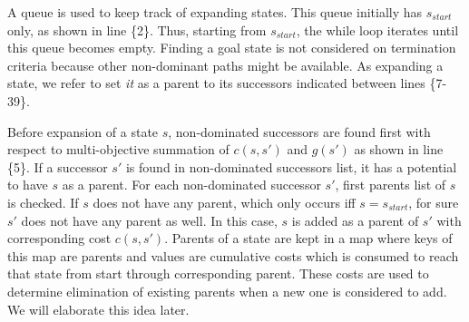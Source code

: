 \documentclass[10pt, a4paper, conference, compsocconf]{IEEEtran}
\begin{document}
A queue is used to keep track of expanding states. This queue initially has $s_{start}$ only, as shown in line \{2\}. Thus, starting from $s_{start}$, the while loop iterates until this queue becomes empty. Finding a goal state is not considered on termination criteria because other non-dominant paths might be available. As expanding a state, we refer to set \textit{it} as a parent to its successors indicated between lines \{7-39\}.

Before expansion of a state $s$, non-dominated successors are found first with respect to multi-objective summation of $c(s,s')$ and $g(s')$ as shown in line \{5\}. If a successor $s'$ is found in non-dominated successors list, it has a potential to have $s$ as a parent. For each non-dominated successor $s'$, first parents list of $s$ is checked. If $s$ does not have any parent, which only occurs iff $s=s_{start}$, for sure $s'$ does not have any parent as well. In this case, $s$ is added  as a parent of $s'$ with corresponding cost $c(s,s')$. Parents of a state are kept in a map where keys of this map are parents and values are cumulative costs which is consumed to reach that state from start through corresponding parent. These costs are used to determine elimination of existing parents when a new one is considered to add. We will elaborate this idea later.
\end{document}
